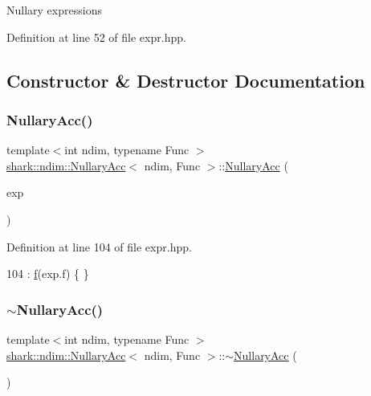 Nullary expressions 

Definition at line 52 of file expr.\+hpp.



\subsection{Constructor \& Destructor Documentation}
\hypertarget{classshark_1_1ndim_1_1_nullary_acc_a65629401dcf916c324bff4f5012688ff}{}\label{classshark_1_1ndim_1_1_nullary_acc_a65629401dcf916c324bff4f5012688ff} 
\subsubsection{\texorpdfstring{Nullary\+Acc()}{NullaryAcc()}}
{\footnotesize\ttfamily template$<$int ndim, typename Func $>$ \\
\hyperlink{classshark_1_1ndim_1_1_nullary_acc}{shark\+::ndim\+::\+Nullary\+Acc}$<$ ndim, Func $>$\+::\hyperlink{classshark_1_1ndim_1_1_nullary_acc}{Nullary\+Acc} (\begin{DoxyParamCaption}\item[{const \hyperlink{classshark_1_1ndim_1_1_nullary_exp}{Nullary\+Exp}$<$ ndim, Func $>$ \&}]{exp }\end{DoxyParamCaption})}



Definition at line 104 of file expr.\+hpp.


\begin{DoxyCode}
104 : \hyperlink{classshark_1_1ndim_1_1_nullary_acc_a2818f289b8c710f249e38a20412cf54d}{f}(exp.f) \{ \}
\end{DoxyCode}
\hypertarget{classshark_1_1ndim_1_1_nullary_acc_a34d1a64e5e395fb4ca2fa636ee164c1c}{}\label{classshark_1_1ndim_1_1_nullary_acc_a34d1a64e5e395fb4ca2fa636ee164c1c} 
\subsubsection{\texorpdfstring{$\sim$\+Nullary\+Acc()}{~NullaryAcc()}}
{\footnotesize\ttfamily template$<$int ndim, typename Func $>$ \\
\hyperlink{classshark_1_1ndim_1_1_nullary_acc}{shark\+::ndim\+::\+Nullary\+Acc}$<$ ndim, Func $>$\+::$\sim$\hyperlink{classshark_1_1ndim_1_1_nullary_acc}{Nullary\+Acc} (\begin{DoxyParamCaption}{ }\end{DoxyParamCaption})}




